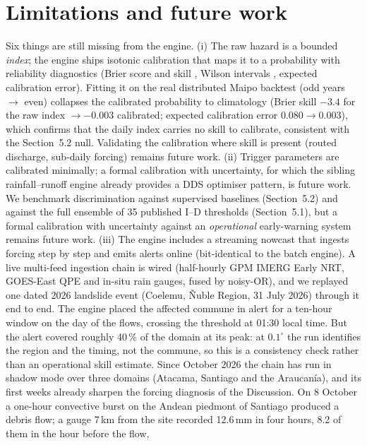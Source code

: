\documentclass[authoryear,preprint,review,12pt]{elsarticle}
\begin{document}
\section{Limitations and future work}
\label{sec:limits}

Six things are still missing from the engine. (i) The raw hazard
is a bounded \emph{index}; the engine ships isotonic calibration \citep{niculescumizil2005} that maps it to a
probability with reliability diagnostics (Brier score and skill \citep{brier1950}, Wilson intervals \citep{wilson1927},
expected calibration error). Fitting it on the real distributed Maipo backtest
(odd years $\to$ even) collapses the calibrated probability to climatology (Brier
skill $-3.4$ for the raw index $\to -0.003$ calibrated; expected calibration error $0.080\to0.003$), which confirms that the daily index carries no skill to calibrate, consistent with the Section~5.2 null. Validating the calibration where
skill is present (routed discharge, sub-daily forcing) remains future work.
(ii) Trigger parameters are calibrated
minimally; a formal calibration with uncertainty, for which the sibling
rainfall--runoff engine already provides a DDS \citep{tolson2007} optimiser pattern, is future work.
We benchmark discrimination against supervised baselines (Section~5.2) and against
the full ensemble of 35 published I--D thresholds (Section~5.1), but a formal
calibration with uncertainty against an \emph{operational} early-warning system
remains future work. (iii) The engine includes a streaming nowcast that ingests
forcing step by step and emits alerts online (bit-identical to the batch engine).
A live multi-feed ingestion chain is wired (half-hourly GPM IMERG Early NRT,
GOES-East QPE and in-situ rain gauges, fused by noisy-OR), and we replayed one dated
2026 landslide event (Coelemu, \~Nuble Region, 31 July 2026) through it end to end. The engine placed the affected
commune in alert for a ten-hour window on the day of the flows, crossing the
threshold at 01:30 local time. But the alert covered roughly 40\,\% of the domain at
its peak: at $0.1^{\circ}$ the run identifies the region and the timing, not the
commune, so this is a consistency check rather than an operational skill
estimate. Since October 2026 the chain has run in shadow mode over three domains
(Atacama, Santiago and the Araucan\'ia), and its first weeks already sharpen the
forcing diagnosis of the Discussion. On 8 October a one-hour convective burst on
the Andean piedmont of Santiago produced a debris flow; a gauge 7\,km from the
site recorded 12.6\,mm in four hours, 8.2 of them in the hour before the flow,
\end{document}
